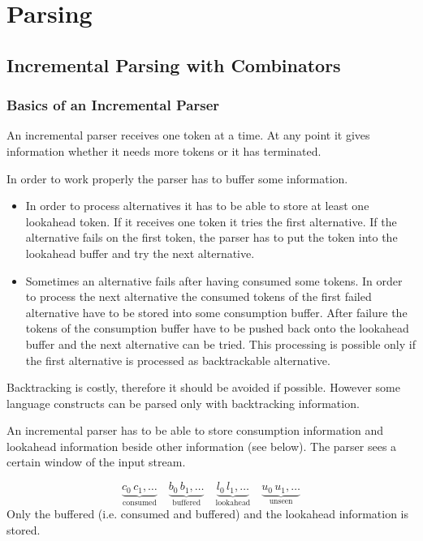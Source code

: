 \chapter{Parsing}

\section{Incremental Parsing with Combinators}

\subsection{Basics of an Incremental Parser}

An incremental parser receives one token at a time. At any point it gives
information whether it needs more tokens or it has terminated.

In order to work properly the parser has to buffer some information.
\begin{itemize}

\item In order to process alternatives it has to be able to store at least one
  lookahead token. If it receives one token it tries the first alternative. If
  the alternative fails on the first token, the parser has to put the token
  into the lookahead buffer and try the next alternative.

\item Sometimes an alternative fails after having consumed some tokens. In
  order to process the next alternative the consumed tokens of the first
  failed alternative have to be stored into some consumption buffer. After
  failure the tokens of the consumption buffer have to be pushed back onto the
  lookahead buffer and the next alternative can be tried. This processing is
  possible only if the first alternative is processed as backtrackable
  alternative.
\end{itemize}

Backtracking is costly, therefore it should be avoided if possible. However
some language constructs can be parsed only with backtracking information.

An incremental parser has to be able to store consumption information and
lookahead information beside other information (see below). The parser sees a
certain window of the input stream.

$$
\underbrace{c_0\,c_1, \ldots}_{\text{consumed}}
\quad
\underbrace{b_0\,b_1, \ldots}_{\text{buffered}}
\quad
\underbrace{l_0\,l_1, \ldots}_{\text{lookahead}}
\quad
\underbrace{u_0\,u_1, \ldots}_{\text{unseen}}
$$
%
Only the buffered (i.e. consumed and buffered) and the lookahead information
is stored.


